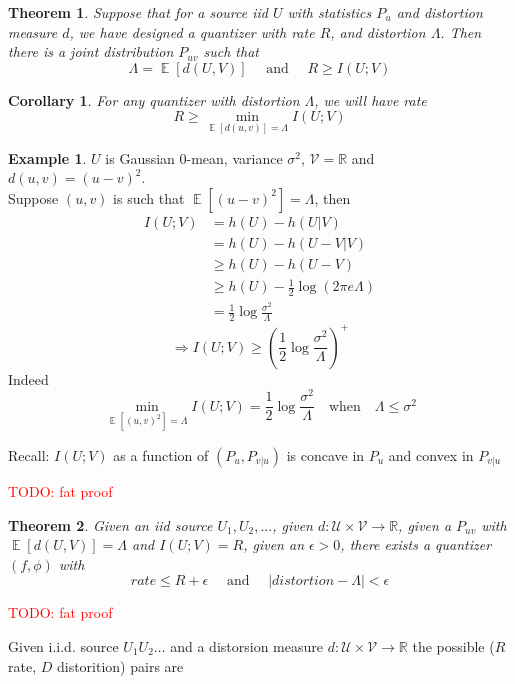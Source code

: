 \documentclass[twoside]{article}
\newtheorem{theorem}{Theorem}[section]
\newtheorem{corollary}{Corollary}[theorem]
\theoremstyle{definition} %
\newtheorem{example}{Example}
\newcommand{\todo}[1]{\textcolor{red}{TODO: #1}}
\def\V{\mathcal{V}}
\def\U{\mathcal{U}}
\def\R{\mathbb{R}}
\DeclareMathOperator{\E}{\mathbb{E}}%
\begin{document}
\begin{theorem}
  Suppose that for a source iid $U$ with statistics $P_u$ and distortion measure $d$, we have designed a quantizer with rate $R$, and distortion $\Lambda$. Then there is a joint distribution $P_{uv}$ such that
  \[
    \Lambda = \E[d(U, V)] \quad \text{ and } \quad R \geq I(U;V)
  \]
\end{theorem}

\begin{corollary}
  For any quantizer with distortion $\Lambda$, we will have rate
  \[
    R \geq \min_{\E[d(u,v)] = \Lambda} I(U;V)
  \]
\end{corollary}

\begin{example}
  $U$ is Gaussian $0$-mean, variance $\sigma^2$, $\V = \R$ and $d(u,v) = (u-v)^2$.\\
  Suppose $(u,v)$ is such that $\E[(u-v)^2] = \Lambda$, then
  \begin{align*}
    I(U;V) &= h(U) - h(U|V) \\
           &= h(U) - h(U-V|V) \\
           &\geq h(U) - h(U-V) \\
           &\geq h(U) - \frac{1}{2} \log(2 \pi e \Lambda) \\
           &= \frac{1}{2} \log \frac{\sigma^2}{\Lambda}
  \end{align*}
  \[
    \Rightarrow I(U;V) \geq (\frac{1}{2} \log \frac{\sigma^2}{\Lambda})^+
  \]
  Indeed
  \[
     \min_{\E[(u,v)^2] = \Lambda} I(U;V) = \frac{1}{2} \log \frac{\sigma^2}{\Lambda} \quad \text{when} \quad \Lambda \leq \sigma^2
  \]

  Recall: $I(U;V)$ as a function of $(P_u, P_{v|u})$ is concave in $P_u$ and convex in $P_{v|u}$
\end{example}

\todo{fat proof}

\begin{theorem}
  Given an iid source $U_1, U_2, ...$, given $d: \U \times \V \rightarrow \R$, given a $P_{uv}$ with $\E[d(U,V)] = \Lambda$ and $I(U;V) = R$, given an $\epsilon > 0$, there exists a quantizer $(f, \phi)$ with
  \[
    rate \leq R + \epsilon \quad \text{ and } \quad |distortion - \Lambda| < \epsilon
  \]
\end{theorem}

\todo{fat proof}



Given i.i.d. source $U_1U_2 \dots$ and a distorsion measure $d:\U \times \V \to \R$ the possible ($R$ rate, $D$ distorition) pairs are
\end{document}
